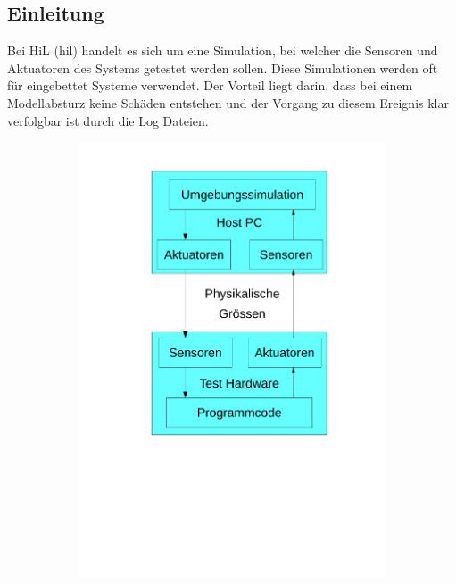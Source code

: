 \subsection{Einleitung}

Bei HiL (\acrlong{hil}) handelt es sich um eine Simulation, bei welcher die Sensoren und Aktuatoren des Systems getestet werden sollen. Diese Simulationen werden oft für eingebettet Systeme verwendet. Der Vorteil liegt darin, dass bei einem Modellabsturz keine Schäden entstehen und der Vorgang zu diesem Ereignis klar verfolgbar ist durch die Log Dateien.

\begin{figure}[ht]
	\begin{center}
		\begin{subfigure}{0.49\textwidth}
			\begin{center}
		\includegraphics[height=0.33\paperheight, trim={5cm 9.5cm 4cm 2cm},clip]{pic/35_hil/hil_1.pdf} 

\end{center}
\end{subfigure}
\end{center}
\end{figure}
